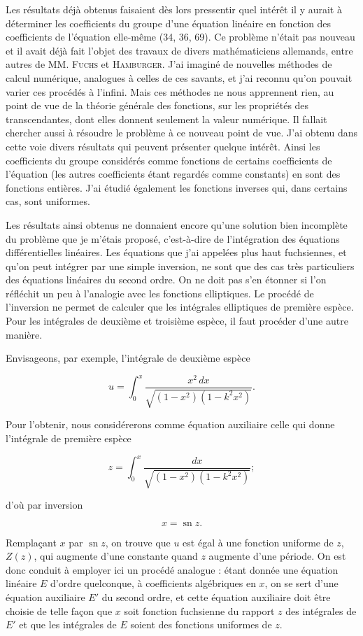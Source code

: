 \documentclass[11pt]{article}
\begin{document}
Les résultats déjà obtenus faisaient dès lors pressentir quel intérêt il y aurait à déterminer les coefficients du groupe d’une équation linéaire en fonction des coefficients de l’équation elle-même (34, 36, 69). Ce problème n’était pas nouveau et il avait déjà fait l’objet des travaux de divers mathématiciens allemands, entre autres de MM. \textsc{Fuchs} et \textsc{Hamburger}. J’ai imaginé de nouvelles méthodes de calcul numérique, analogues à celles de ces savants, et j’ai reconnu qu’on pouvait varier ces procédés à l’infini. Mais ces méthodes ne nous apprennent rien, au point de vue de la théorie générale des fonctions, sur les propriétés des transcendantes, dont elles donnent seulement la valeur numérique. Il fallait chercher aussi à résoudre le problème à ce nouveau point de vue. J’ai obtenu dans cette voie divers résultats qui peuvent présenter quelque intérêt. Ainsi les coefficients du groupe considérés comme fonctions de certains coefficients de l’équation (les autres coefficients étant regardés comme constants) en sont des fonctions entières. J’ai étudié également les fonctions inverses qui, dans certains cas, sont uniformes.

Les résultats ainsi obtenus ne donnaient encore qu’une solution bien incomplète du problème que je m’étais proposé, c’est-à-dire de l’intégration des équations différentielles linéaires. Les équations que j’ai appelées plus haut fuchsiennes, et qu’on peut intégrer par une simple inversion, ne sont que des cas très particuliers des équations linéaires du second ordre. On ne doit pas s’en étonner si l’on réfléchit un peu à l’analogie avec les fonctions elliptiques. Le procédé de l’inversion ne permet de calculer que les intégrales elliptiques de première espèce. Pour les intégrales de deuxième et troisième espèce, il faut procéder d’une autre manière.

Envisageons, par exemple, l’intégrale de deuxième espèce

\[
 u=\int_0^x \frac{x^2\,dx}{\sqrt{(1-x^2)(1-k^2x^2)}}.
\]

Pour l’obtenir, nous considérerons comme équation auxiliaire celle qui donne l’intégrale de première espèce

\[
 z=\int_0^x \frac{dx}{\sqrt{(1-x^2)(1-k^2x^2)}};
\]

d’où par inversion

\[
 x=\operatorname{sn} z.
\]

Remplaçant $x$ par $\operatorname{sn} z$, on trouve que $u$ est égal à une fonction uniforme de $z$, $Z(z)$, qui augmente d’une constante quand $z$ augmente d’une période. On est donc conduit à employer ici un procédé analogue : étant donnée une équation linéaire $E$ d’ordre quelconque, à coefficients algébriques en $x$, on se sert d’une équation auxiliaire $E'$ du second ordre, et cette équation auxiliaire doit être choisie de telle façon que $x$ soit fonction fuchsienne du rapport $z$ des intégrales de $E'$ et que les intégrales de $E$ soient des fonctions uniformes de $z$.
\end{document}
